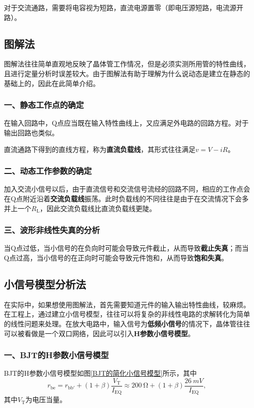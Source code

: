 对于交流通路，需要将电容视为短路，直流电源置零（即电压源短路，电流源开路）。

\subsection{图解法}
图解法往往简单直观地反映了晶体管工作情况，但是必须实测所用管的特性曲线，且进行定量分析时误差较大。由于图解法有助于理解为什么说动态是建立在静态的基础上的，因此在此简单介绍。

\subsubsection{一、静态工作点的确定}
在输入回路中，Q点应当既在输入特性曲线上，又应满足外电路的回路方程。对于输出回路也类似。

直流通路下得到的直线方程，称为\textbf{直流负载线}，其形式往往满足$v=V-iR$。

\subsubsection{二、动态工作参数的确定}
加入交流小信号以后，由于直流信号和交流信号流经的回路不同，相应的工作点会在Q点附近沿着\textbf{交流负载线}振荡。此时负载线的不同往往是由于在交流情况下会多并上一个$R_\mathrm{L}$，因此交流负载线比直流负载线更陡。

\subsubsection{三、波形非线性失真的分析}
当Q点过低，当小信号的在负向时可能会导致元件截止，从而导致\textbf{截止失真}；而当Q点过高，当小信号的在正向时可能会导致元件饱和，从而导致\textbf{饱和失真}。

\subsection{小信号模型分析法}
在实际中，如果想使用图解法，首先需要知道元件的输入输出特性曲线，较麻烦。在工程上，通过建立小信号模型，往往可以将复杂的非线性电路的求解转化为简单的线性问题来处理。在放大电路中，输入信号为\textbf{低频小信号}的情况下，晶体管往往可以被看做是一个双口网络，因此可以引入\textbf{H参数小信号模型}。

\subsubsection{一、BJT的H参数小信号模型}
BJT的H参数小信号模型如图\ref{BJT的简化小信号模型}所示，其中
\begin{equation}\label{公式-BJT的小信号模型}
    r_{\mathrm{be}}=r_{\mathrm{bb'}}+(1+\beta)\frac{V_\mathrm{T}}{I_{\mathrm{EQ}}}\approx\qty{200}{\ohm}+(1+\beta)\frac{\qty{26}{mV}}{I_{\mathrm{EQ}}},
\end{equation}
其中$V_\mathrm{T}$为电压当量。

